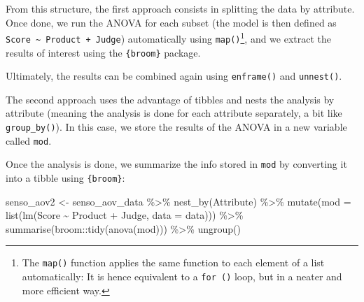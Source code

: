\documentclass[
]{krantz}
\makeatletter
\newenvironment{Shaded}{\begin{snugshade}}{\end{snugshade}}
\newcommand{\AttributeTok}[1]{\textcolor[rgb]{0.61,0.61,0.61}{#1}}
\newcommand{\ControlFlowTok}[1]{\textcolor[rgb]{0.27,0.27,0.27}{\textbf{#1}}}
\newcommand{\FunctionTok}[1]{\textcolor[rgb]{0,0,0}{#1}}
\newcommand{\NormalTok}[1]{#1}
\newcommand{\OtherTok}[1]{\textcolor[rgb]{0.37,0.37,0.37}{#1}}
\newcommand{\SpecialCharTok}[1]{\textcolor[rgb]{0,0,0}{#1}}
\newcommand{\StringTok}[1]{\textcolor[rgb]{0.5,0.5,0.5}{#1}}
\newenvironment{kframe}{%
\medskip{}
\setlength{\fboxsep}{.8em}
 \def\at@end@of@kframe{}%
 \ifinner\ifhmode%
  \def\at@end@of@kframe{\end{minipage}}%
  \begin{minipage}{\columnwidth}%
 \fi\fi%
 \def\FrameCommand##1{\hskip\@totalleftmargin \hskip-\fboxsep
 \colorbox{shadecolor}{##1}\hskip-\fboxsep
     \hskip-\linewidth \hskip-\@totalleftmargin \hskip\columnwidth}%
 \MakeFramed {\advance\hsize-\width
   \@totalleftmargin\z@ \linewidth\hsize
   \@setminipage}}%
 {\par\unskip\endMakeFramed%
 \at@end@of@kframe}
\renewenvironment{Shaded}{\begin{kframe}}{\end{kframe}}
\makeatother
\begin{document}
From this structure, the first approach consists in splitting the data by attribute. Once done, we run the ANOVA for each subset (the model is then defined as \texttt{Score\ \textasciitilde{}\ Product\ +\ Judge}) automatically using \texttt{map()}\footnote{The \texttt{map()} function applies the same function to each element of a list automatically: It is hence equivalent to a \texttt{for\ ()} loop, but in a neater and more efficient way.}, and we extract the results of interest using the \texttt{\{broom\}} package.

Ultimately, the results can be combined again using \texttt{enframe()} and \texttt{unnest()}.

\begin{Shaded}
\end{Shaded}

The second approach uses the advantage of tibbles and nests the analysis by attribute (meaning the analysis is done for each attribute separately, a bit like \texttt{group\_by()}). In this case, we store the results of the ANOVA in a new variable called \texttt{mod}.

Once the analysis is done, we summarize the info stored in \texttt{mod} by converting it into a tibble using \texttt{\{broom\}}:

\begin{Shaded}
\begin{Highlighting}[]
\NormalTok{senso\_aov2 }\OtherTok{\textless{}{-}}\NormalTok{ senso\_aov\_data }\SpecialCharTok{\%\textgreater{}\%}
  \FunctionTok{nest\_by}\NormalTok{(Attribute) }\SpecialCharTok{\%\textgreater{}\%}
  \FunctionTok{mutate}\NormalTok{(}\AttributeTok{mod =} \FunctionTok{list}\NormalTok{(}\FunctionTok{lm}\NormalTok{(Score }\SpecialCharTok{\textasciitilde{}}\NormalTok{ Product }\SpecialCharTok{+}\NormalTok{ Judge, }\AttributeTok{data =}\NormalTok{ data))) }\SpecialCharTok{\%\textgreater{}\%}
  \FunctionTok{summarise}\NormalTok{(broom}\SpecialCharTok{::}\FunctionTok{tidy}\NormalTok{(}\FunctionTok{anova}\NormalTok{(mod))) }\SpecialCharTok{\%\textgreater{}\%}
  \FunctionTok{ungroup}\NormalTok{()}
\end{Highlighting}
\end{Shaded}
\end{document}

